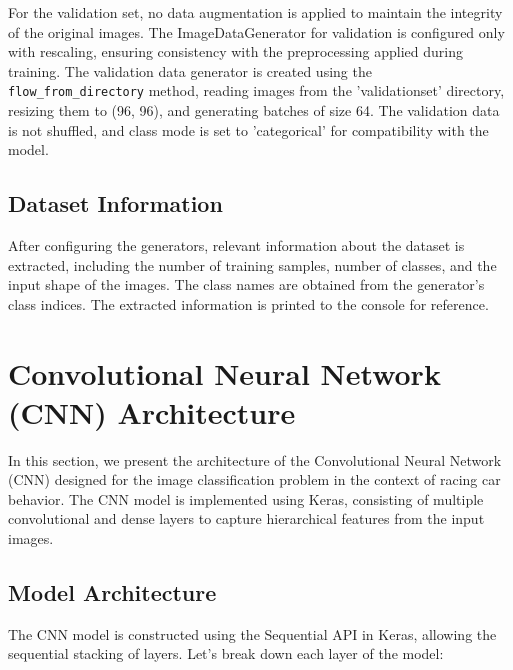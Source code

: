 \documentclass{article}
\begin{document}
For the validation set, no data augmentation is applied to maintain the integrity of the original images. The ImageDataGenerator for validation is configured only with rescaling, ensuring consistency with the preprocessing applied during training.
\newline
\newline
The validation data generator is created using the \texttt{flow\_from\_directory} method, reading images from the 'validationset' directory, resizing them to (96, 96), and generating batches of size 64. The validation data is not shuffled, and class mode is set to 'categorical' for compatibility with the model.

\subsection{Dataset Information}

After configuring the generators, relevant information about the dataset is extracted, including the number of training samples, number of classes, and the input shape of the images. The class names are obtained from the generator's class indices. The extracted information is printed to the console for reference.

\section{Convolutional Neural Network (CNN) Architecture}

In this section, we present the architecture of the Convolutional Neural Network (CNN) designed for the image classification problem in the context of racing car behavior. The CNN model is implemented using Keras, consisting of multiple convolutional and dense layers to capture hierarchical features from the input images.

\subsection{Model Architecture}

The CNN model is constructed using the Sequential API in Keras, allowing the sequential stacking of layers. Let's break down each layer of the model:
\end{document}
